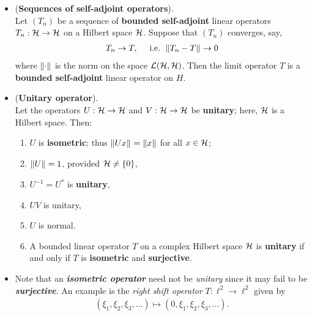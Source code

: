 \documentclass[11pt]{article}
\begin{document}
\begin{itemize}
\item \begin{proposition} (\textbf{Sequences of self-adjoint operators}). \citep{kreyszig1989introductory}\\
 Let $(T_n)$ be a sequence of \textbf{bounded self-adjoint} linear operators $T_n: {\mathcal H} \rightarrow {\mathcal H}$ on a Hilbert space ${\mathcal H}$. Suppose that $(T_n)$ converges, say,
 \begin{align*}
 T_n \rightarrow T, \quad \text{ i.e. } \left\|T_n - T\right\|_{} \rightarrow 0
 \end{align*}
where $\left\|\cdot\right\|_{}$ is the norm on the space ${\mathcal L}({\mathcal H}, {\mathcal H})$. Then the limit operator $T$ is a \textbf{bounded self-adjoint} linear operator on $H$.
\end{proposition}

\item \begin{proposition} (\textbf{Unitary operator}). \citep{kreyszig1989introductory}\\
Let the operators $U: {\mathcal H} \rightarrow {\mathcal H}$ and $V: {\mathcal H} \rightarrow {\mathcal H}$ be \textbf{unitary}; here, ${\mathcal H}$ is a Hilbert space. Then:
\begin{enumerate}
\item $U$ is \textbf{isometric}; thus $\left\|Ux\right\|_{} = \left\|x\right\|_{}$ for all $x \in {\mathcal H}$;
\item $\left\|U\right\|_{}= 1$, provided ${\mathcal H} \neq \{0\}$,
\item $U^{-1}= U^{*}$ is \textbf{unitary},
\item $UV$ is unitary,
\item $U$ is normal.
\item A bounded linear operator $T$ on a complex Hilbert space ${\mathcal H}$ is \textbf{unitary} if and only if $T$ is \textbf{isometric} and \textbf{surjective}.
\end{enumerate}
\end{proposition}

\item \begin{remark}
Note that an \emph{\textbf{isometric operator}} need not be \emph{unitary} since it may fail to be \emph{\textbf{surjective}}. An example is the \emph{right shift operator} $T: \ell^2 \rightarrow \ell^2$ given by
\begin{align*}
(\xi_1, \xi_2, \xi_3, \ldots) \mapsto (0, \xi_1, \xi_2, \xi_3, \ldots).
\end{align*}
\end{remark}
\end{itemize}
\end{document}
